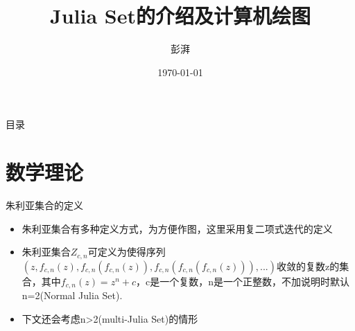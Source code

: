 \documentclass[serif]{beamer}
\begin{document}
\title[title]{Julia Set的介绍及计算机绘图}

\author[]{彭湃} 


\date[Date below]{\today} 


\begin{frame}

\thispagestyle{empty}

\titlepage

\end{frame}


\begin{frame}{目录}

\tableofcontents 

\end{frame}


\section{数学理论}

\begin{frame}{朱利亚集合的定义}

\begin{itemize}
\item 朱利亚集合有多种定义方式，为方便作图，这里采用复二项式迭代的定义

\item 朱利亚集合$Z_{c,n}$可定义为使得序列$(z, f_{c,n}(z),f_{c,n}(f_{c,n}(z)),f_{c,n}(f_{c,n}(f_{c,n}(z))), ...)$收敛的复数z的集合，其中$f_{c,n}(z)=z^n+c$，c是一个复数，n是一个正整数，不加说明时默认n=2(Normal Julia Set).

\item 下文还会考虑n>2(multi-Julia Set)的情形\cite{JuliaSet}

\end{itemize}

\end{frame}

\end{document}
